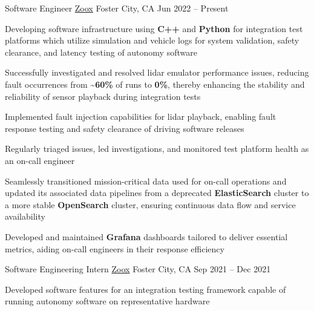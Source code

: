 \documentclass[]{awesome-cv}
\begin{document}
\begin{cventries}
	\cventry
	{Software Engineer}
	{\href{https://zoox.com/}{Zoox}}
	{Foster City, CA}
	{Jun 2022 – Present}
	{\begin{cvitems}
        \item Developing software infrastructure using \textbf{C++} and \textbf{Python} for integration test platforms which utilize simulation and vehicle logs for system validation, safety clearance, and latency testing of autonomy software
        \item Successfully investigated and resolved lidar emulator performance issues, reducing fault occurrences from \textbf{\~{}60\%} of runs to \textbf{0\%}, thereby enhancing the stability and reliability of sensor playback during integration tests
        \item Implemented fault injection capabilities for lidar playback, enabling fault response testing and safety clearance of driving software releases
        \item Regularly triaged issues, led investigations, and monitored test platform health as an on-call engineer
        \item Seamlessly transitioned mission-critical data used for on-call operations and updated its associated data pipelines from a deprecated \textbf{ElasticSearch} cluster to a more stable \textbf{OpenSearch} cluster, ensuring continuous data flow and service availability
        \item Developed and maintained \textbf{Grafana} dashboards tailored to deliver essential metrics, aiding on-call engineers in their response efficiency
	\end{cvitems}}
	\cventry
	{Software Engineering Intern}
	{\href{https://zoox.com/}{Zoox}}
	{Foster City, CA}
	{Sep 2021 – Dec 2021}
	{\begin{cvitems}
	    \item Developed software features for an integration testing framework capable of running autonomy software on representative hardware

\end{cvitems}}
\end{cventries}
\end{document}
